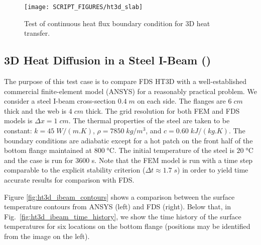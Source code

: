 \documentclass[11pt]{book}
\begin{document}
\begin{figure}[ht]
\centering
\texttt{[image: SCRIPT\_FIGURES/ht3d\_slab]}
\caption[The  test cases]{Test of continuous heat flux boundary condition for 3D heat transfer.}
\label{fig:ht3d_slab}
\end{figure}

\subsection{3D Heat Diffusion in a Steel I-Beam (\texorpdfstring{}{ht3d\_ibeam})}
\label{ht3d_ibeam}

The purpose of this test case is to compare FDS HT3D with a well-established commercial finite-element model (ANSYS) for a reasonably practical problem.  We consider a steel I-beam cross-section $0.4 \;\si{m}$ on each side.  The flanges are $6 \;\si{cm}$ thick and the web is $4 \;\si{cm}$ thick.  The grid resolution for both FEM and FDS models is $\Delta x = 1 \;\si{cm}$.  The thermal properties of the steel are taken to be constant: $k=45 \;\si{W/(m.K)}$, $\rho=7850 \;\si{kg/m^3}$, and $c = 0.60 \;\si{kJ/(kg.K)}$.  The boundary conditions are adiabatic except for a hot patch on the front half of the bottom flange maintained at $800 \;\si{\degreeCelsius}$.  The initial temperature of the steel is $20 \;\si{\degreeCelsius}$ and the case is run for 3600 s.  Note that the FEM model is run with a time step comparable to the explicit stability criterion ($\Delta t \approx 1.7 \;\si{s}$) in order to yield time accurate results for comparison with FDS.

Figure \ref{fig:ht3d_ibeam_contours} shows a comparison between the surface temperature contours from ANSYS (left) and FDS (right).  Below that, in Fig.~\ref{fig:ht3d_ibeam_time_history}, we show the time history of the surface temperatures for six locations on the bottom flange (positions may be identified from the image on the left).
\end{document}
